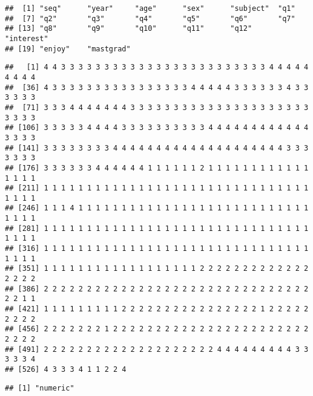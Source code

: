 \documentclass[]{article}
\newenvironment{Shaded}{\begin{snugshade}}{\end{snugshade}}
\newcommand{\CommentTok}[1]{\textcolor[rgb]{0.56,0.35,0.01}{\textit{#1}}}
\newcommand{\KeywordTok}[1]{\textcolor[rgb]{0.13,0.29,0.53}{\textbf{#1}}}
\newcommand{\NormalTok}[1]{#1}
\newcommand{\OperatorTok}[1]{\textcolor[rgb]{0.81,0.36,0.00}{\textbf{#1}}}
\begin{document}
\begin{verbatim}
##  [1] "seq"      "year"     "age"      "sex"      "subject"  "q1"      
##  [7] "q2"       "q3"       "q4"       "q5"       "q6"       "q7"      
## [13] "q8"       "q9"       "q10"      "q11"      "q12"      "interest"
## [19] "enjoy"    "mastgrad"
\end{verbatim}

\begin{Shaded}
\end{Shaded}

\begin{verbatim}
##   [1] 4 4 3 3 3 3 3 3 3 3 3 3 3 3 3 3 3 3 3 3 3 3 3 3 3 3 4 4 4 4 4 4 4 4 4
##  [36] 4 3 3 3 3 3 3 3 3 3 3 3 3 3 3 3 3 4 4 4 4 4 3 3 3 3 3 3 4 3 3 3 3 3 3
##  [71] 3 3 3 4 4 4 4 4 4 4 3 3 3 3 3 3 3 3 3 3 3 3 3 3 3 3 3 3 3 3 3 3 3 3 3
## [106] 3 3 3 3 3 4 4 4 4 3 3 3 3 3 3 3 3 3 3 4 4 4 4 4 4 4 4 4 4 4 4 3 3 3 3
## [141] 3 3 3 3 3 3 3 3 4 4 4 4 4 4 4 4 4 4 4 4 4 4 4 4 4 4 4 4 3 3 3 3 3 3 3
## [176] 3 3 3 3 3 3 4 4 4 4 4 4 1 1 1 1 1 1 2 1 1 1 1 1 1 1 1 1 1 1 1 1 1 1 1
## [211] 1 1 1 1 1 1 1 1 1 1 1 1 1 1 1 1 1 1 1 1 1 1 1 1 1 1 1 1 1 1 1 1 1 1 1
## [246] 1 1 1 4 1 1 1 1 1 1 1 1 1 1 1 1 1 1 1 1 1 1 1 1 1 1 1 1 1 1 1 1 1 1 1
## [281] 1 1 1 1 1 1 1 1 1 1 1 1 1 1 1 1 1 1 1 1 1 1 1 1 1 1 1 1 1 1 1 1 1 1 1
## [316] 1 1 1 1 1 1 1 1 1 1 1 1 1 1 1 1 1 1 1 1 1 1 1 1 1 1 1 1 1 1 1 1 1 1 1
## [351] 1 1 1 1 1 1 1 1 1 1 1 1 1 1 1 1 1 1 2 2 2 2 2 2 2 2 2 2 2 2 2 2 2 2 2
## [386] 2 2 2 2 2 2 2 2 2 2 2 2 2 2 2 2 2 2 2 2 2 2 2 2 2 2 2 2 2 2 2 2 2 1 1
## [421] 1 1 1 1 1 1 1 1 1 2 2 2 2 2 2 2 2 2 2 2 2 2 2 2 2 1 2 2 2 2 2 2 2 2 2
## [456] 2 2 2 2 2 2 2 1 2 2 2 2 2 2 2 2 2 2 2 2 2 2 2 2 2 2 2 2 2 2 2 2 2 2 2
## [491] 2 2 2 2 2 2 2 2 2 2 2 2 2 2 2 2 2 2 2 2 4 4 4 4 4 4 4 4 4 3 3 3 3 3 4
## [526] 4 3 3 3 4 1 1 2 2 4
\end{verbatim}

\begin{Shaded}
\end{Shaded}

\begin{verbatim}
## [1] "numeric"
\end{verbatim}
\end{document}
